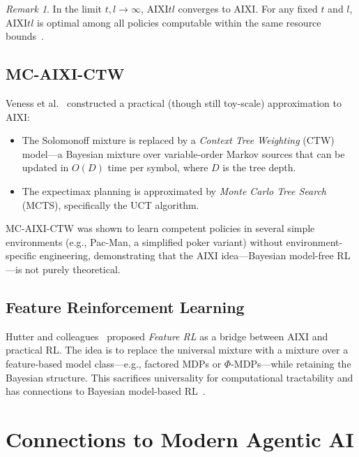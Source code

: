 \documentclass[11pt,a4paper]{article}
\theoremstyle{definition}
\theoremstyle{remark}
\newtheorem{remark}[theorem]{Remark}
\begin{document}
\begin{remark}
In the limit $t,l\to\infty$, AIXI$tl$ converges to AIXI.
For any fixed $t$ and $l$, AIXI$tl$ is optimal among all policies computable
within the same resource bounds~\cite{Hutter2005}.
\end{remark}

\subsection{MC-AIXI-CTW}

Veness et al.~\cite{Veness2011} constructed a practical (though still
toy-scale) approximation to AIXI:
\begin{itemize}[nosep]
\item The Solomonoff mixture is replaced by a \emph{Context Tree Weighting}
      (CTW) model---a Bayesian mixture over variable-order Markov sources that
      can be updated in $O(D)$ time per symbol, where $D$ is the tree depth.
\item The expectimax planning is approximated by \emph{Monte Carlo Tree Search}
      (MCTS), specifically the UCT algorithm.
\end{itemize}
MC-AIXI-CTW was shown to learn competent policies in several simple
environments (e.g., Pac-Man, a simplified poker variant) without
environment-specific engineering, demonstrating that the AIXI idea---Bayesian
model-free RL---is not purely theoretical.

\subsection{Feature Reinforcement Learning}

Hutter and colleagues~\cite{Hutter2009Feature} proposed \emph{Feature RL}
as a bridge between AIXI and practical RL.  The idea is to replace the
universal mixture with a mixture over a feature-based model class---e.g.,
factored MDPs or $\Phi$-MDPs---while retaining the Bayesian structure.
This sacrifices universality for computational tractability and has
connections to Bayesian model-based RL~\cite{Ghavamzadeh2015}.

\section{Connections to Modern Agentic AI}\label{sec:modern}
\end{document}
